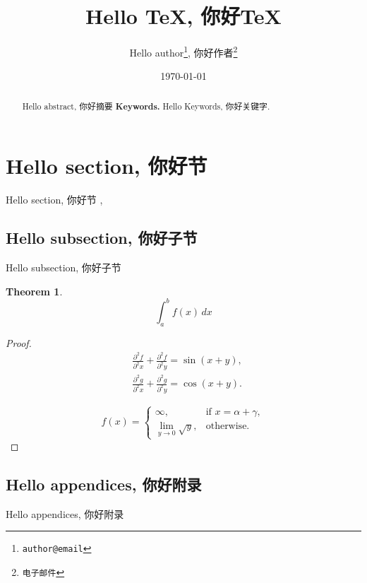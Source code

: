 \documentclass[12pt,a4paper]{article}
\newtheorem{theorem}{Theorem}[section]
\begin{document}
\title{\bf Hello TeX, 你好TeX}
\author{
Hello author\footnote{{\tt author@email}},
你好作者\footnote{{\tt 电子邮件}}
}
\date{\today}
\maketitle
\begin{abstract}
Hello abstract, 你好摘要
\vskip0.3cm {\bf Keywords.} Hello Keywords, 你好关键字.
\end{abstract}

\section{Hello section, 你好节}
{\color{red}Hello section}, 你好节
\cite{Babuska1989Finite, Brenner2008Mathematical},
\cite{2004有限元方法的数学基础}
\subsection{Hello subsection, 你好子节}
Hello subsection, 你好子节
\begin{theorem}
\begin{equation*}
\int_{a}^{b} f(x) \,dx
\end{equation*}
\end{theorem}
\begin{proof}
\begin{align*}
&\frac{\partial^2 f}{\partial^2 x}+\frac{\partial^2 f}{\partial^2 y} = \sin(x+y), \\
&\frac{\partial^2 g}{\partial^2 x}+\frac{\partial^2 g}{\partial^2 y} = \cos(x+y).
\end{align*}

\begin{equation*}
f(x)=\begin{cases}
\infty,  & \mbox{if } x=\alpha+\gamma,  \\
\lim\limits_{y\rightarrow 0}\sqrt{y},  & \mbox{otherwise}.
\end{cases}
\end{equation*}
\end{proof}





\begin{appendices}
\section{Hello appendices, 你好附录}
Hello appendices, 你好附录
\end{appendices}
\end{document}
